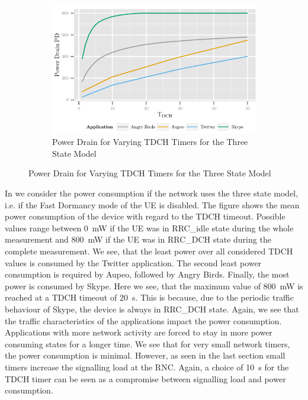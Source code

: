 \begin{figure}
	\begin{subfigure}[b]{\textwidth}
	\centering
	\includegraphics{network/network_traces/numerical_results/figures/3_state_tdch_vs_power_drain}
	\caption{Power Drain for Varying \gls{TDCH} Timers for the Three State Model}\label{fig:network:network_traces:numerical_results:three_states:power_drain}
	\end{subfigure}
\end{figure}
In  we consider the power consumption if the network uses the three state model, i.e. if the Fast Dormancy mode of the \gls{UE} is disabled.
The figure shows the mean power consumption of the device with regard to the \gls{TDCH} timeout.
Possible values range between \SI{0}{\milli\watt} if the \gls{UE} was in \gls{RRC_idle} state during the whole measurement and \SI{800}{\milli\watt} if the \gls{UE} was in \gls{RRC_DCH} state during the complete measurement.
We see, that the least power over all considered \gls{TDCH} values is consumed by the Twitter application.
The second least power consumption is required by Aupeo, followed by Angry Birds.
Finally, the most power is consumed by Skype.
Here we see, that the maximum value of \SI{800}{\milli\watt} is reached at a \gls{TDCH} timeout of \SI{20}{\second}.
This is because, due to the periodic traffic behaviour of Skype, the device is always in \gls{RRC_DCH} state.
Again, we see that the traffic characteristics of the applications impact the power consumption.
Applications with more network activity are forced to stay in more power consuming states for a longer time.
We see that for very small network timers, the power consumption is minimal.
However, as seen in the last section small timers increase the signalling load at the \gls{RNC}.
Again, a choice of \SI{10}{\second} for the \gls{TDCH} timer can be seen as a compromise between signalling load and power consumption.

